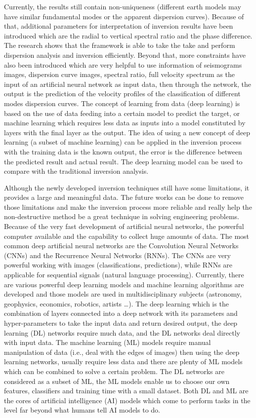 Currently, the results still contain non-uniqueness (different earth models may have similar fundamental modes or the apparent dispersion curves). Because of that, additional parameters for interpretation of inversion results have been introduced which are the radial to vertical spectral ratio and the phase difference. The research shows that the framework is able to take the take and perform dispersion analysis and inversion efficiently. Beyond that, more constraints have also been introduced which are very helpful to use information of seismograms images, dispersion curve images, spectral ratio, full velocity spectrum as the input of an artificial neural network as input data, then through the network, the output is the prediction of the velocity profiles of the classification of different modes dispersion curves. The concept of learning from data (deep learning) is based on the use of data feeding into a certain model to predict the target, or machine learning which requires less data as inputs into a model constituted by layers with the final layer as the output. The idea of using a new concept of deep learning (a subset of machine learning) can be applied in the inversion process with the training data is the known output, the error is the difference between the predicted result and actual result. The deep learning model can be used to compare with the traditional inversion analysis.

Although the newly developed inversion techniques still have some limitations, it provides a large and meaningful data. The future works can be done to remove those limitations and make the inversion process more reliable and really help the non-destructive method be a great technique in solving engineering problems. Because of the very fast development of artificial neural networks, the powerful computer available and the capability to collect huge amounts of data. The most common deep artificial neural networks are the Convolution Neural Networks (CNNs) and the Recurrence Neural Networks (RNNs). The CNNs are very powerful working with images (classifications, predictions), while RNNs are applicable for sequential signals (natural language processing). Currently, there are various powerful deep learning models and machine learning algorithms are developed and those models are used in multidisciplinary subjects (astronomy, geophysics, economics, robotics, artists …). The deep learning which is the combination of layers connected into a deep network with its parameters and hyper-parameters to take the input data and return desired output, the deep learning (DL) networks require much data, and the DL networks deal directly with input data. The machine learning (ML) models require manual manipulation of data (i.e., deal with the edges of images) then using the deep learning networks, usually require less data and there are plenty of ML models which can be combined to solve a certain problem. The DL networks are considered as a subset of ML, the ML models enable us to choose our own features, classifiers and training time with a small dataset. Both DL and ML are the cores of artificial intelligence (AI) models which come to perform tasks in the level far beyond what humans tell AI models to do. 


